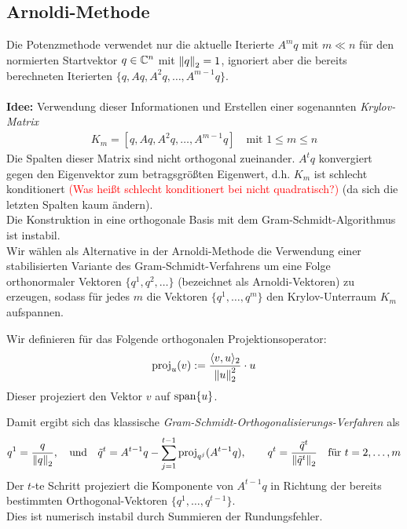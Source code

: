 \subsection{Arnoldi-Methode}
Die Potenzmethode verwendet nur die aktuelle Iterierte $A^mq$ mit $m\ll n$ für den normierten Startvektor 
$q\in\mathbb C  ^n$ mit $\vertn{2}{q}_2=1$, ignoriert aber die bereits berechneten Iterierten $\{q,Aq,A^2q,\dotsc,A^{m-1}q\}$. \\ \\
\textbf{Idee:} Verwendung dieser Informationen und Erstellen einer sogenannten \textit{Krylov-Matrix}
\begin{align*}K_m = [q,Aq,A^2q,\dotsc,A^{m-1}q]\quad\text{mit }1\leq m\leq n\end{align*}
Die Spalten dieser Matrix sind nicht orthogonal zueinander. $A^tq$ konvergiert gegen den Eigenvektor zum betragsgrößten
Eigenwert, d.h. $K_m$ ist schlecht konditionert \textcolor{red}{(Was heißt schlecht konditionert bei nicht quadratisch?)} (da sich die letzten Spalten kaum ändern). \\
Die Konstruktion in eine orthogonale Basis mit dem Gram-Schmidt-Algorithmus ist instabil. \\
Wir wählen als Alternative in der Arnoldi-Methode die Verwendung einer stabilisierten Variante des 
Gram-Schmidt-Verfahrens um eine Folge orthonormaler Vektoren $\{q^1,q^2,\dotsc\}$ (bezeichnet als 
Arnoldi-Vektoren) zu erzeugen, sodass für jedes $m$ die Vektoren $\{q^1,\dotsc,q^m\}$ den Krylov-Unterraum $K_m$ 
aufspannen. 
\newpage
\begin{defbox}
Wir definieren für das Folgende orthogonalen Projektionsoperator:
\begin{align*}\text{proj}_u(v) := \dfrac{\langle v,u\rangle_2}{\vertn{2}{u}_2^2}\cdot u\end{align*}
Dieser projeziert den Vektor $v$ auf $\text{span}\{u\}$.
\end{defbox}
Damit ergibt sich das klassische \textit{Gram-Schmidt-Orthogonalisierungs-Verfahren} als 
\begin{align*}q^{1} = \dfrac{q}{\vertn{2}{q}_2},\quad\text{und}\quad\tilde{q}^{t} = A^{t-1}q - \sum_{j=1}^{t-1} \text{proj}_{q^j}(A^{t-1}q), 
\qquad q^t = \dfrac{\tilde{q}^t}{\vertn{2}{\tilde{q}^t}_2}\quad\text{für } t=2,\dotsc,m\end{align*}
Der $t$-te Schritt projeziert die Komponente von $A^{t-1}q$ in Richtung der bereits bestimmten Orthogonal-Vektoren 
$\{q^1,\dotsc,q^{t-1}\}$. \\
Dies ist numerisch instabil durch Summieren der Rundungsfehler. \\ \\
